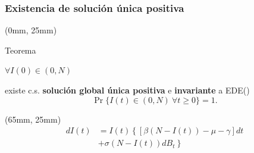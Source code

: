 \begin{frame}
    \frametitle{Existencia de solución única positiva}
    \begin{textblock*}{60mm}(0mm, 25mm)
        \begin{yellowbox}{Teorema}
            \begin{list}{\bullet}{}
                \item
                    $ \forall I(0) \in (0, N)$
            \end{list}
            \tcblower
             existe c.s.
            \textbf{solución 
            global única positiva} 
            e 
            \textbf{invariante}
            a EDE(\star)
            $$
                \Pr
                \{
                    I(t) \in (0, N)
                    \ \forall t \geq 0
                \} = 1.
            $$
        \end{yellowbox}
    \end{textblock*}
    \begin{textblock*}{60mm}(65mm, 25mm)
        \begin{align*}
            dI(t) &= 
                I(t)
                \left\{
                    [
                        \beta (N - I(t))
                        -\mu - \gamma
                    ]
                    dt
                \right.
                \\
                 &+
                \left.
                    \sigma (N-I(t))
                    dB_t
                \right\}
                \tag{\star}
        \end{align*}
    \end{textblock*}
\end{frame}
